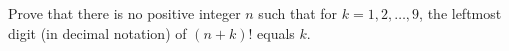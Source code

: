 Prove that there is no positive integer $n$ such that for $k = 1, 2, \ldots, 9$, the leftmost digit (in decimal notation) of $(n+k)!$ equals $k$.
